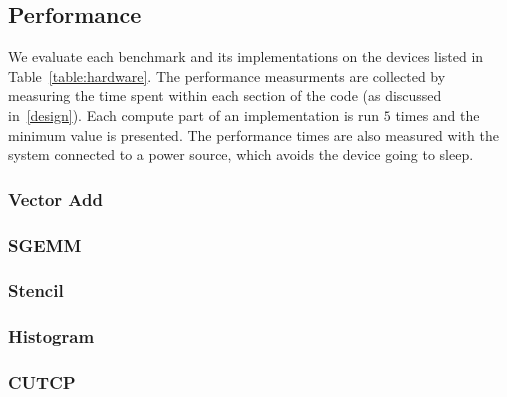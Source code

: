 \subsection{Performance}

We evaluate each benchmark and its implementations on the devices listed
  in Table~\ref{table:hardware}.
The performance measurments are collected by measuring the time
  spent within each section of the code (as discussed in~\ref{design}).
Each compute part of an implementation is run $5$ %
  times and the minimum value is presented.
The performance times are also measured with the system connected to a
  power source, which avoids the device going to sleep.

\subsubsection{Vector Add}

\subsubsection{SGEMM}

\subsubsection{Stencil}

\subsubsection{Histogram}

\subsubsection{CUTCP}



